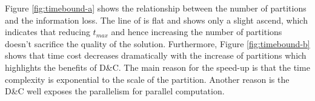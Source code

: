 

Figure \ref{fig:timebound-a} shows the relationship between the number of
partitions and the information loss. The line of \psdist is flat and \psrule
shows only a slight ascend, which indicates that reducing $t_{max}$ and hence
increasing the number of partitions doesn't sacrifice the quality of the
solution. Furthermore, Figure \ref{fig:timebound-b} shows that time cost
decreases dramatically with the increase of partitions which highlights the
benefits of D\&C. The main reason for the speed-up is that the time
complexity is exponential to the scale of the partition.
Another reason is the D\&C well exposes the parallelism for parallel computation.




